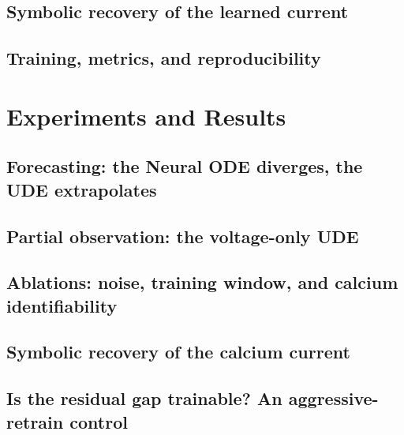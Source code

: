 \documentclass{article}
\begin{document}
\subsection{Symbolic recovery of the learned current}

\subsection{Training, metrics, and reproducibility}

\section{Experiments and Results}
\label{sec:results}

\subsection{Forecasting: the Neural ODE diverges, the UDE extrapolates}

\subsection{Partial observation: the voltage-only UDE}

\subsection{Ablations: noise, training window, and calcium identifiability}

\subsection{Symbolic recovery of the calcium current}

\subsection{Is the residual gap trainable? An aggressive-retrain control}
\end{document}
